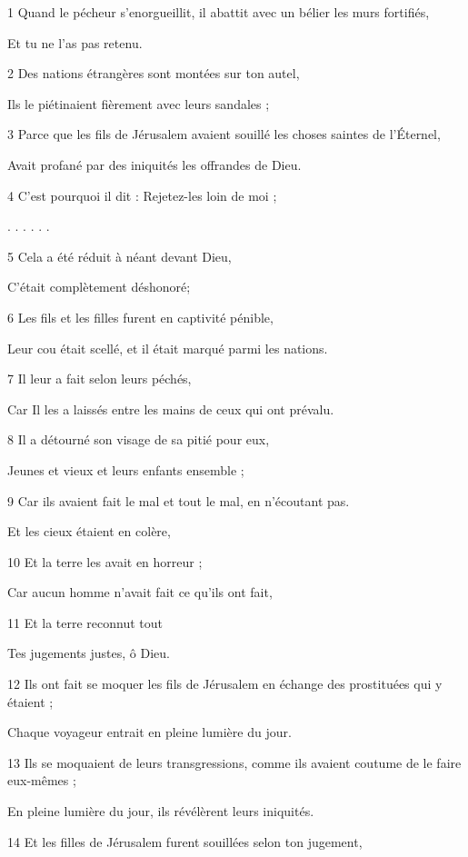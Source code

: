 \par 1 Quand le pécheur s'enorgueillit, il abattit avec un bélier les murs fortifiés,
\par     Et tu ne l'as pas retenu.
\par 2 Des nations étrangères sont montées sur ton autel,
\par     Ils le piétinaient fièrement avec leurs sandales ;
\par 3 Parce que les fils de Jérusalem avaient souillé les choses saintes de l'Éternel,
\par     Avait profané par des iniquités les offrandes de Dieu.
\par 4 C'est pourquoi il dit : Rejetez-les loin de moi ;
\par     . . . . . .
\par 5 Cela a été réduit à néant devant Dieu,
\par     C'était complètement déshonoré;
\par 6 Les fils et les filles furent en captivité pénible,
\par     Leur cou était scellé, et il était marqué parmi les nations.
\par 7 Il leur a fait selon leurs péchés,
\par     Car Il les a laissés entre les mains de ceux qui ont prévalu.
\par 8 Il a détourné son visage de sa pitié pour eux,
\par     Jeunes et vieux et leurs enfants ensemble ;
\par 9 Car ils avaient fait le mal et tout le mal, en n'écoutant pas.
\par     Et les cieux étaient en colère,
\par 10 Et la terre les avait en horreur ;
\par     Car aucun homme n'avait fait ce qu'ils ont fait,
\par 11 Et la terre reconnut tout
\par     Tes jugements justes, ô Dieu.
\par 12 Ils ont fait se moquer les fils de Jérusalem en échange des prostituées qui y étaient ;
\par     Chaque voyageur entrait en pleine lumière du jour.
\par 13 Ils se moquaient de leurs transgressions, comme ils avaient coutume de le faire eux-mêmes ;
\par     En pleine lumière du jour, ils révélèrent leurs iniquités.
\par 14 Et les filles de Jérusalem furent souillées selon ton jugement,
